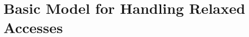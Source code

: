 \newcommand{\figrelaxed}{
\begin{figure*}[t]
\small
\begin{mathpar}
%
\vspace*{-1mm}
%
\inferrule[\textsc{(thread: silent)}]
{
\sigma \astep{\silentt} \sigma' 
}
{\tup{\tup{\sigma, \rlxcur, \lprom}, \mem} \astep{} \tup{\tup{\sigma', \rlxcur, \lprom}, \mem}}
\and
\inferrule[\textsc{(thread: read)}]
{
\begin{array}{c}
\sigma \astep{\rlab(x,v)} \sigma' \quad \rlxmsg{x}{v}{t} \in \mem \\
\rlxcur(x) \leq t \quad \rlxcur'=\rlxcur[x\mapsto t]
\end{array}
}
{\tup{\tup{\sigma, \rlxcur, \lprom}, \mem} \astep{} \tup{\tup{\sigma', \rlxcur', \lprom}, \mem}}
\and
\inferrule[\textsc{(thread: write)}]
{
\begin{array}{c}
\sigma \astep{\wlab(x,v)} \sigma' \quad \mem'=\mem \insertadd \rlxmsg{x}{v}{t} \\
\rlxcur(x) < t \quad \rlxcur'= \rlxcur[x\mapsto t]
\end{array}
}
{\tup{\tup{\sigma, \rlxcur, \lprom},\mem} \astep{} \tup{\tup{\sigma', \rlxcur', \lprom}, \mem'}}
\and
\inferrule[\textsc{(thread: promise)}]
{
\mem' = \mem \insertadd m \\
\lprom' = \lprom \insertadd m 
}
{\tup{\tup{\sigma, \rlxcur, \lprom},\mem} \astep{} \tup{\tup{\sigma, \rlxcur, \lprom'},\mem'}}
\and
\inferrule[\textsc{(thread: fulfill)}]
{
\begin{array}{c}
\sigma \astep{\wlab(x,v)} \sigma' \quad \rlxmsg{x}{v}{t} \in \lprom \quad \lprom'=\lprom\setminus \setofz{\rlxmsg{x}{v}{t}} \\
\rlxcur(x) < t \quad \rlxcur' = \rlxcur[x\mapsto t] 
\end{array}
}
{\tup{\tup{\sigma, \rlxcur, \lprom},\mem} \astep{} \tup{\tup{\sigma', \rlxcur', \lprom'}, \mem}}
\and
\inferrule[\textsc{(machine step)}]
{
\begin{array}{c}
\tup{\gts(i),\mem} \astep{}^+ \tup{\lts',\mem'} \\
\tup{\lts',\mem'} \text{ is consistent}
\end{array}}
{\tup{\gts,\mem} \astep{} \tup{\gts[i\mapsto \lts'],\mem'}}
\end{mathpar}
\caption{Operational semantics for only relaxed read and write}
\label{fig:relaxed-opsem}
\end{figure*}}

\section{Basic Model for Handling Relaxed Accesses}
\label{sec:relaxed}

